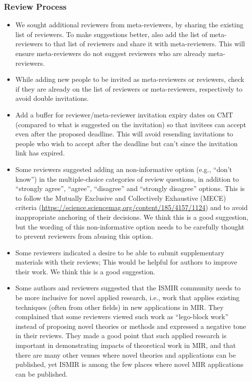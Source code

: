 \documentclass[%
10pt,								%
]
{scrartcl}
\begin{document}
        \subsubsection{Review Process}
            \begin{itemize}
                \item   We sought additional reviewers from meta-reviewers, by sharing the existing list of reviewers. To make suggestions better, also add the list of meta-reviewers to that list of reviewers and share it with meta-reviewers. This will ensure meta-reviewers do not suggest reviewers who are already meta-reviewers.
                \item   While adding new people to be invited as meta-reviewers or reviewers, check if they are already on the list of reviewers or meta-reviewers, respectively to avoid double invitations.
                \item   Add a buffer for reviewer/meta-reviewer invitation expiry dates on CMT (compared to what is suggested on the invitation) so that invitees can accept even after the proposed deadline. This will avoid resending invitations to people who wish to accept after the deadline but can’t since the invitation link has expired.
                \item   Some reviewers suggested adding an non-informative option (e.g., “don’t know”) in the multiple-choice categories of review questions, in addition to “strongly agree”, “agree”, “disagree” and “strongly disagree” options. This is to follow the Mutually Exclusive and Collectively Exhaustive (MECE) criteria (\href{https://science.sciencemag.org/content/185/4157/1124}{https://science.sciencemag.org/content/185/4157/1124}) and to avoid inappropriate anchoring of their decisions. We think this is a good suggestion, but the wording of this non-informative option needs to be carefully thought to prevent reviewers from abusing this option.
                \item   Some reviewers indicated a desire to be able to submit supplementary materials with their reviews; This would be helpful for authors to improve their work. We think this is a good suggestion.
                \item   Some authors and reviewers suggested that the ISMIR community needs to be more inclusive for novel applied research, i.e., work that applies existing techniques (often from other fields) in new applications in MIR. They complained that some reviewers viewed such work as “lego-block work” instead of proposing novel theories or methods and expressed a negative tone in their reviews. They made a good point that such applied research is important in demonstrating impacts of theoretical work in MIR, and that there are many other venues where novel theories and applications can be published, yet ISMIR is among the few places where novel MIR applications can be published.

\end{itemize}
\end{document}
